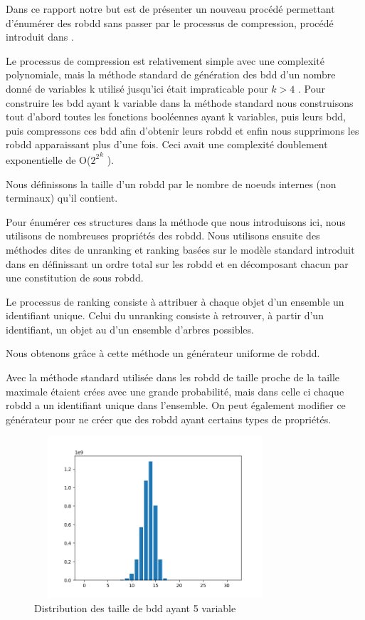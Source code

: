 \documentclass[french]{article}
\begin{document}
Dans ce rapport notre but est de présenter un nouveau procédé permettant d'énumérer des robdd sans passer par le processus de compression, procédé introduit dans \cite{genitrini}.\medskip

Le processus de compression est relativement simple avec une complexité polynomiale, mais la méthode standard de génération des bdd d'un nombre donné de variables k utilisé jusqu'ici était impraticable pour {\(k > 4\)} \cite{newton}. Pour construire les bdd ayant k variable dans la méthode standard nous construisons tout d'abord toutes les fonctions booléennes ayant k variables, puis leurs bdd, puis compressons ces bdd afin d'obtenir leurs robdd et enfin nous supprimons les robdd apparaissant plus d'une fois. Ceci avait une complexité doublement exponentielle de  O(\( {2^2}^k\) ).\medskip

Nous définissons la taille d'un robdd par le nombre de noeuds internes (non terminaux) qu'il contient.

Pour énumérer ces structures dans la méthode que nous introduisons ici, nous utilisons de nombreuses propriétés des robdd.  Nous utilisons ensuite des méthodes dites de unranking et ranking basées sur le modèle standard introduit dans \cite{wilf} en définissant un ordre total sur les robdd et en décomposant chacun par une constitution de sous robdd.

Le processus de ranking consiste à attribuer à chaque objet d'un ensemble un identifiant unique. Celui du unranking consiste à retrouver, à partir d'un identifiant, un objet au d'un ensemble d'arbres possibles.\medskip

Nous obtenons grâce à cette méthode un générateur uniforme de robdd.\medskip

Avec la méthode standard utilisée dans \cite{newton} les robdd de taille proche de la taille maximale étaient crées avec une grande probabilité, mais dans celle ci chaque robdd a un identifiant unique dans l'ensemble. On peut également modifier ce générateur pour ne créer que des robdd ayant certains types de propriétés.

\begin{figure}[htp]
    \centering
    \includegraphics[width=9cm, height=6cm]{index5}
    \caption{Distribution des taille de bdd ayant 5 variable}
    \label{fig:Figure1.2}
\end{figure}
\end{document}
